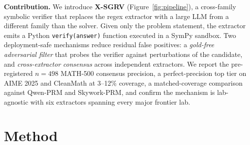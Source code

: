 \documentclass{article}
\begin{document}
\textbf{Contribution.} We introduce \textbf{X-SGRV} (Figure~\ref{fig:pipeline}), a cross-family symbolic verifier that replaces the regex extractor with a large LLM from a different family than the solver. Given only the problem statement, the extractor emits a Python \texttt{verify(answer)} function executed in a SymPy sandbox. Two deployment-safe mechanisms reduce residual false positives: a \emph{gold-free adversarial filter} that probes the verifier against perturbations of the candidate, and \emph{cross-extractor consensus} across independent extractors. We report the pre-registered $n{=}498$ MATH-500 consensus precision, a perfect-precision top tier on AIME 2025 and CleanMath at 3--12\% coverage, a matched-coverage comparison against Qwen-PRM and Skywork-PRM, and confirm the mechanism is lab-agnostic with six extractors spanning every major frontier lab.

\section{Method}
\end{document}
